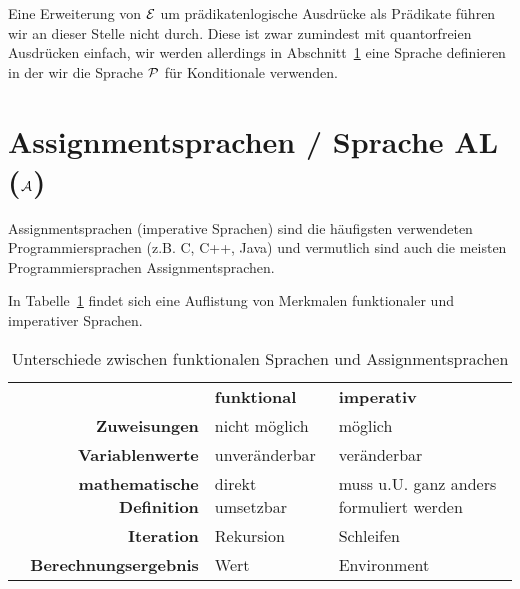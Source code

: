 {\begin{comment}
\textit{Lösung:}
\begin{align*}
&\quad \I{P}{\omega}{\text{istLeer?}(x)\twedge ist1?(x)} \\
&\lra \I{P}{\omega}{\text{istLeer?}(x)}\wedge\I{P}{\omega}{ist1?(x)} \\
&\lra \text{istLeer?}(\I{T}{\omega}{x})\wedge\text{ist1?}(\I{T}{\omega}{x}) \\
&\lra \text{istLeer?}(\omega(\u{x}))\wedge\text{ist1?}(\omega(\u{x})) \\
\intertext{$\text{istLeer?}(\omega(\u{x}))=T$ genau dann wenn $\omega(\u{x})=\varepsilon$, dann ist aber $\text{ist1?}(\omega(\u{x}))=F$. Die Und-Verknüfpung kann also nicht zu $T$ evaluieren.}
&\lra F
\end{align*}
Der Ausdruck ist \textbf{nicht erfüllbar}.
\end{\whichenum}
\end{bsp}
\ifthenelse{\boolean{long}}{}{\end{comment}}

Eine Erweiterung von $\mathcal{E}$ um prädikatenlogische Ausdrücke als Prädikate
führen wir an dieser Stelle nicht durch. Diese ist zwar zumindest mit quantorfreien
Ausdrücken einfach, wir werden allerdings in Abschnitt~\ref{sec:AL} eine Sprache
definieren in der wir die Sprache $\mathcal{P}$ für Konditionale verwenden.

\section{Assignmentsprachen / Sprache AL ($\mathcal{A}$)}\label{sec:AL}
Assignmentsprachen (imperative Sprachen) sind die häufigsten verwendeten Programmiersprachen (z.B. C, C++, Java)
und vermutlich sind auch die meisten Programmiersprachen Assignmentsprachen.

In Tabelle~\ref{unterschiede_funktional_imperativ} findet sich eine Auflistung von Merkmalen funktionaler und imperativer Sprachen.
\begin{table}[h!t]
 \centering

\begin{tabular}{rp{0.25\hsize}p{0.25\hsize}}
 & \textbf{funktional} & \textbf{imperativ} \\
\textbf{Zuweisungen} & nicht möglich & möglich \\
\textbf{Variablenwerte} & unveränderbar & veränderbar \\
\textbf{mathematische Definition} & direkt umsetzbar & muss u.U. ganz anders formuliert werden \\
\textbf{Iteration} & Rekursion & Schleifen \\
\textbf{Berechnungsergebnis} & Wert & Environment
\end{tabular}

\caption{Unterschiede zwischen funktionalen Sprachen und Assignmentsprachen}
 \label{unterschiede_funktional_imperativ}
\end{table}

